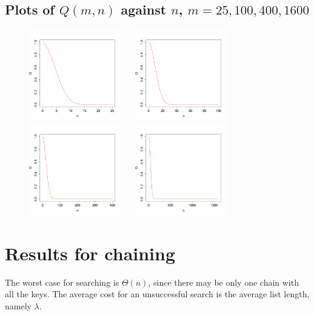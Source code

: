 \subsection{Plots of $Q(m, n)$ against $n$, $m=25,100,400,1600$}
\begin{figure}[htb]
\centering
\includegraphics[width=4cm]{figs/birthday25.pdf}
$\quad$
\includegraphics[width=4cm]{figs/birthday100.pdf}\\
\includegraphics[width=4cm]{figs/birthday400.pdf}
$\quad$
\includegraphics[width=4cm]{figs/birthday1600.pdf}
\end{figure}

\section{Results for chaining}
The worst case for searching is $\Theta(n)$, since there may be only one chain with all the keys. 
The average cost for an unsuccessful search is the average list length, namely $\lambda$.

